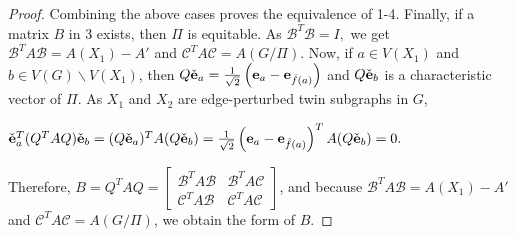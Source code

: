 \documentclass[10pt,a4paper]{amsart}
\def \e {{\bf e}}
\newcommand{\ob}[1]{\left(#1\right)}
\begin{document}
\begin{proof}
Combining the above cases proves the equivalence of 1-4. Finally, if a matrix $B$ in 3 exists, then $\Pi$ is equitable. As $\mathcal{B}^T\mathcal{B}=I,$ we get $\mathcal{B}^TA\mathcal{B}=A(X_1)-A'$ and $\mathcal{C}^TA\mathcal{C}=A(G/\Pi).$ Now, if $a\in V(X_1)$ and $b\in V(G)\backslash V(X_1)$, then $Q\check{\e}_a= \frac{1}{\sqrt{2}}\ob{\e_a-\e_{\hat{f}(a)}}$ and $Q\check{\e}_b$ is a characteristic vector of $\Pi$. As $X_1$ and $X_2$ are edge-perturbed twin subgraphs in $G$,
\begin{center}
$\check{\e}_a^T(Q^TAQ)\check{\e}_b=(Q\check{\e}_a)^TA(Q\check{\e}_b)=\frac{1}{\sqrt{2}}\ob{\e_a-\e_{\hat{f}(a)}}^TA(Q\check{\e}_b)=0.$
\end{center} 
Therefore, $B=Q^TAQ=\begin{bmatrix} \mathcal{B}^TA\mathcal{B} & \mathcal{B}^TA\mathcal{C}\\ \mathcal{C}^TA\mathcal{B} & \mathcal{C}^TA\mathcal{C}\end{bmatrix}$, and because $\mathcal{B}^TA\mathcal{B}=A(X_1)-A'$ and $\mathcal{C}^TA\mathcal{C}=A(G/\Pi)$, we obtain the form of $B.$
\end{proof}
\end{document}
